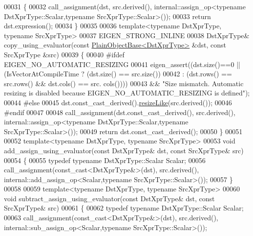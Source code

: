 \begin{DoxyCode}
00031   \{
00032     call\_assignment(dst, src.derived(), internal::assign\_op<typename DstXprType::Scalar,typename
       SrcXprType::Scalar>());
00033     \textcolor{keywordflow}{return} dst.expression();
00034   \}
00035   
00036   \textcolor{keyword}{template}<\textcolor{keyword}{typename} DstXprType, \textcolor{keyword}{typename} SrcXprType>
00037   EIGEN\_STRONG\_INLINE
00038   DstXprType& copy\_using\_evaluator(\textcolor{keyword}{const} \hyperlink{class_eigen_1_1_plain_object_base}{PlainObjectBase<DstXprType>} &dst, \textcolor{keyword}{const}
       SrcXprType &src)
00039   \{
00040 \textcolor{preprocessor}{    #ifdef EIGEN\_NO\_AUTOMATIC\_RESIZING}
00041     eigen\_assert((dst.size()==0 || (IsVectorAtCompileTime ? (dst.size() == src.size())
00042                                                           : (dst.rows() == src.rows() && dst.cols() == src.
      cols())))
00043                 && \textcolor{stringliteral}{"Size mismatch. Automatic resizing is disabled because EIGEN\_NO\_AUTOMATIC\_RESIZING is
       defined"});
00044 \textcolor{preprocessor}{  #else}
00045     dst.const\_cast\_derived().\hyperlink{class_eigen_1_1_plain_object_base_acc7200947e6399bee847ff37c8270fc8}{resizeLike}(src.derived());
00046 \textcolor{preprocessor}{  #endif}
00047     
00048     call\_assignment(dst.const\_cast\_derived(), src.derived(), internal::assign\_op<typename
       DstXprType::Scalar,typename SrcXprType::Scalar>());
00049     \textcolor{keywordflow}{return} dst.const\_cast\_derived();
00050   \}
00051 
00052   \textcolor{keyword}{template}<\textcolor{keyword}{typename} DstXprType, \textcolor{keyword}{typename} SrcXprType>
00053   \textcolor{keywordtype}{void} add\_assign\_using\_evaluator(\textcolor{keyword}{const} DstXprType& dst, \textcolor{keyword}{const} SrcXprType& src)
00054   \{
00055     \textcolor{keyword}{typedef} \textcolor{keyword}{typename} DstXprType::Scalar Scalar;
00056     call\_assignment(const\_cast<DstXprType&>(dst), src.derived(), internal::add\_assign\_op<Scalar,typename
       SrcXprType::Scalar>());
00057   \}
00058 
00059   \textcolor{keyword}{template}<\textcolor{keyword}{typename} DstXprType, \textcolor{keyword}{typename} SrcXprType>
00060   \textcolor{keywordtype}{void} subtract\_assign\_using\_evaluator(\textcolor{keyword}{const} DstXprType& dst, \textcolor{keyword}{const} SrcXprType& src)
00061   \{
00062     \textcolor{keyword}{typedef} \textcolor{keyword}{typename} DstXprType::Scalar Scalar;
00063     call\_assignment(const\_cast<DstXprType&>(dst), src.derived(), internal::sub\_assign\_op<Scalar,typename
       SrcXprType::Scalar>());

\end{DoxyCode}
